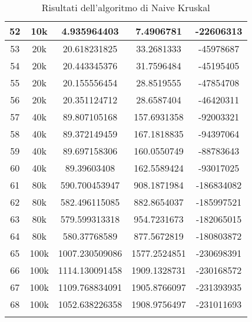\begin{center}
\begin{longtable}{|c|c|c|c|c|}
52 & 10k & 4.935964403 & 7.4906781 & -22606313\\
\hline
53 & 20k & 20.618231825 & 33.2681333 & -45978687\\
54 & 20k & 20.443345376 & 31.7596484 & -45195405\\
55 & 20k & 20.155556454 & 28.8519555 & -47854708\\
56 & 20k & 20.351124712 & 28.6587404 & -46420311\\
\hline
57 & 40k & 89.807105168 & 157.6931358 & -92003321\\
58 & 40k & 89.372149459 & 167.1818835 & -94397064\\
59 & 40k & 89.697158306 & 160.0550749 & -88783643\\
60 & 40k & 89.39603408 & 162.5589424 & -93017025\\
\hline
61 & 80k & 590.700453947 & 908.1871984 & -186834082\\
62 & 80k & 582.496115085 & 882.8654037 & -185997521\\
63 & 80k & 579.599313318 & 954.7231673 & -182065015\\
64 & 80k & 580.37768589 & 877.5672819 & -180803872\\
\hline
65 & 100k & 1007.230509086 & 1577.2524851 & -230698391\\
66 & 100k & 1114.130091458 & 1909.1328731 & -230168572\\
67 & 100k & 1109.768834091 & 1905.8766097 & -231393935\\
68 & 100k & 1052.638226358 & 1908.9756497 & -231011693\\ \hline
		\caption{Risultati dell'algoritmo di Naive Kruskal} 
	\end{longtable}
\end{center}
